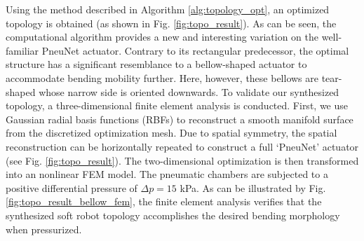 Using the method described in Algorithm \ref{alg:topology_opt}, an optimized topology is obtained (as shown in Fig. \ref{fig:topo_result}). As can be seen, the computational algorithm provides a new and interesting variation on the well-familiar PneuNet actuator. Contrary to its rectangular predecessor, the optimal structure has a significant resemblance to a bellow-shaped actuator to accommodate bending mobility further. Here, however, these bellows are tear-shaped whose narrow side is oriented downwards. To validate our synthesized topology, a three-dimensional finite element analysis is conducted. First, we use Gaussian radial basis functions (RBFs) to reconstruct a smooth manifold surface from the discretized optimization mesh. Due to spatial symmetry, the spatial reconstruction can be horizontally repeated to construct a full `PneuNet' actuator (see Fig. \ref{fig:topo_result}). The two-dimensional optimization is then transformed into an nonlinear FEM model. The pneumatic chambers are subjected to a positive differential pressure of $\Delta p = 15$ kPa. As can be illustrated by Fig. \ref{fig:topo_result_bellow_fem}, the finite element analysis verifies that the synthesized soft robot topology accomplishes the desired bending morphology when pressurized.